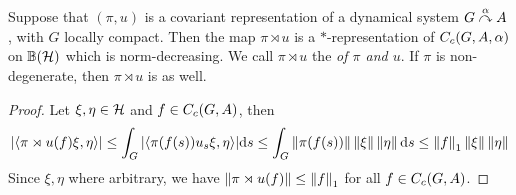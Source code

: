 \begin{proposition}
Suppose that $(\pi,u)$ is a covariant representation of a dynamical system $G \stackrel{\alpha}{\curvearrowright} A$, with $G$ locally compact. Then the map $\pi \rtimes u$ is a $*$-representation of $C_c(G,A,\alpha)$ on $\mathbb{B}(\mathcal{H})$ which is norm-decreasing. We call $\pi \rtimes u$ the  \emph{of $\pi$ and $u$}. If $\pi$ is non-degenerate, then $\pi \rtimes u$ is as well.
\label{cross:integform}
\end{proposition}
\begin{proof}
Let $\xi , \eta \in \mathcal{H}$ and $f \in C_c(G,A)$, then
\begin{align*}
	 |\langle \pi \rtimes u (f) \xi , \eta \rangle| \leq \int_G | \langle \pi(f(s)) u_s \xi , \eta \rangle| \mathrm{d} s \leq \int_G \left\lVert \pi(f(s)) \right\rVert \left\lVert \xi\right\rVert \left\lVert \eta \right\rVert\mathrm{d} s \leq \left\lVert f \right\rVert_1 \left\lVert \xi \right\rVert \left\lVert \eta \right\rVert
\end{align*}
Since $\xi, \eta$ where arbitrary, we have $\left\lVert \pi \rtimes u (f) \right\rVert \leq \left\lVert f \right\rVert_1$ for all $f \in C_c(G,A)$.


\end{proof}
